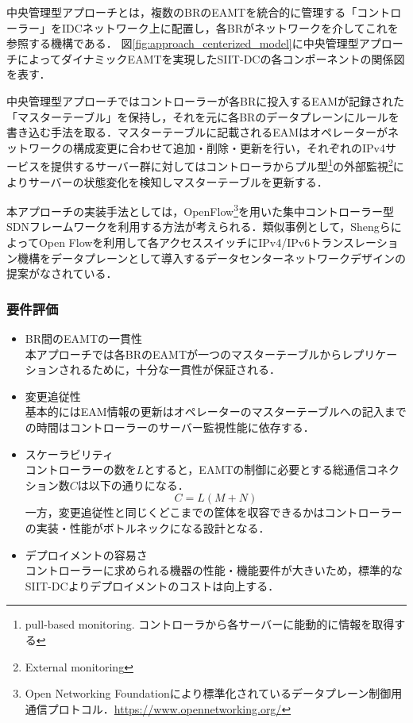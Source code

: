中央管理型アプローチとは，複数のBRのEAMTを統合的に管理する「コントローラー」をIDCネットワーク上に配置し，各BRがネットワークを介してこれを参照する機構である．
図\ref{fig:approach_centerized_model}に中央管理型アプローチによってダイナミックEAMTを実現したSIIT-DCの各コンポーネントの関係図を表す．

中央管理型アプローチではコントローラーが各BRに投入するEAMが記録された「マスターテーブル」を保持し，それを元に各BRのデータプレーンにルールを書き込む手法を取る．マスターテーブルに記載されるEAMはオペレーターがネットワークの構成変更に合わせて追加・削除・更新を行い，それぞれのIPv4サービスを提供するサーバー群に対してはコントローラからプル型\footnote{pull-based monitoring. コントローラから各サーバーに能動的に情報を取得する}の外部監視\footnote{External monitoring}によりサーバーの状態変化を検知しマスターテーブルを更新する．

本アプローチの実装手法としては，OpenFlow\footnote{Open Networking Foundationにより標準化されているデータプレーン制御用通信プロトコル．\url{https://www.opennetworking.org/}}を用いた集中コントローラー型SDNフレームワークを利用する方法が考えられる\cite{RFC7426}．類似事例として，ShengらによってOpen Flowを利用して各アクセススイッチにIPv4/IPv6トランスレーション機構をデータプレーンとして導入するデータセンターネットワークデザインの提案がなされている\cite{7560347}．


\subsubsection{要件評価}

\begin{itemize}
    \item BR間のEAMTの一貫性 \\
    本アプローチでは各BRのEAMTが一つのマスターテーブルからレプリケーションされるために，十分な一貫性が保証される．
    \item 変更追従性 \\
    基本的にはEAM情報の更新はオペレーターのマスターテーブルへの記入までの時間はコントローラーのサーバー監視性能に依存する．
    \item スケーラビリティ　\\
    コントローラーの数を$L$とすると，EAMTの制御に必要とする総通信コネクション数$C$は以下の通りになる．
    \begin{equation}
        C = L(M + N)
    \end{equation}
    一方，変更追従性と同じくどこまでの筐体を収容できるかはコントローラーの実装・性能がボトルネックになる設計となる．
    \item デプロイメントの容易さ　\\
    コントローラーに求められる機器の性能・機能要件が大きいため，標準的なSIIT-DCよりデプロイメントのコストは向上する．

\end{itemize}



